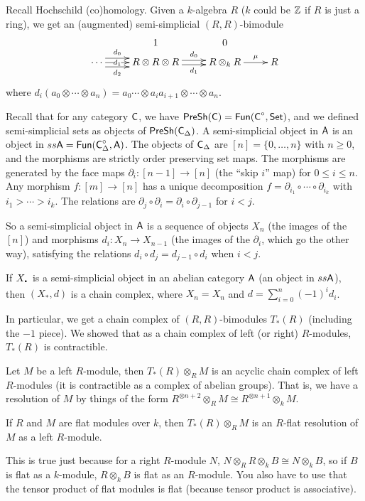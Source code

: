
Recall Hochschild (co)homology. Given a $k$-algebra $R$ ($k$ could be $\mathbb{Z}$ if $R$ is just a ring), we get an (augmented) semi-simplicial $(R,R)$-bimodule
\[\xymatrix@R-1.5pc{
  & 1 & 0\\
 \cdots \ar[r]|-{d_1}\ar@<1ex>[r]^-{d_0}\ar@<-1ex>[r]_-{d_2} & R\otimes R\otimes R\ar@<.5ex>[r]^-{d_0}\ar@<-.5ex>[r]_-{d_1} & R\otimes_k R\ar[r]^-\mu & R
}\]
where $d_i(a_0\otimes \cdots \otimes a_n)= a_0\cdots \otimes a_ia_{i+1}\otimes \cdots \otimes a_n$.

Recall that for any category $\text{\sf C}$, we have $\operatorname{\sf PreSh}(\text{\sf C})=\text{\sf Fun}(\text{\sf C}^\circ,\operatorname{\sf Set})$, and we defined semi-simplicial sets as objects of $\operatorname{\sf PreSh}(\text{\sf C}_\Delta)$. A semi-simplicial object in $\text{\sf A}$ is an object in $ss\text{\sf A}=\text{\sf Fun}(\text{\sf C}_\Delta^\circ, \text{\sf A})$. The objects of $\text{\sf C}_\Delta$ are $[n]=\{0,\dots, n\}$ with $n\ge 0$, and the morphisms are strictly order preserving set maps. The morphisms are generated by the face maps $\partial_i\colon [n-1]\to [n]$ (the ``skip $i$'' map) for $0\le i\le n$. Any morphism $f\colon [m]\to [n]$ has a unique decomposition $f=\partial_{i_1}\circ\cdots\circ \partial_{i_k}$ with $i_1>\cdots >i_k$. The relations are $\partial_j\circ \partial_i=\partial_i\circ\partial_{j-1}$ for $i<j$.

So a semi-simplicial object in $\text{\sf A}$ is a sequence of objects $X_n$ (the images of the $[n]$) and morphisms $d_i\colon X_n\to X_{n-1}$ (the images of the $\partial_i$, which go the other way), satisfying the relations $d_i\circ d_j=d_{j-1}\circ d_i$ when $i<j$.

\begin{lemma}
 If $X_\udot$ is a semi-simplicial object in an abelian category $\text{\sf A}$ (an object in $ss\text{\sf A}$), then $(X_*,d)$ is a chain complex, where $X_n=X_n$ and $d=\sum_{i=0}^n (-1)^i d_i$.
\end{lemma}
 In particular, we get a chain complex of $(R,R)$-bimodules $T_*(R)$ (including the $-1$ piece). We showed that as a chain complex of left (or right) $R$-modules, $T_*(R)$ is contractible.

Let $M$ be a left $R$-module, then $T_*(R)\otimes_R M$ is an acyclic chain complex of left $R$-modules (it is contractible as a complex of abelian groups). That is, we have a resolution of $M$ by things of the form $R^{\otimes n+2}\otimes_R M\cong R^{\otimes n+1}\otimes_k M$.
\begin{lemma}
 If $R$ and $M$ are flat modules over $k$, then $T_*(R)\otimes_R M$ is an $R$-flat resolution of $M$ as a left $R$-module.
\end{lemma}
This is true just because for a right $R$-module $N$, $N\otimes_R R\otimes_k B\cong N\otimes_k B$, so if $B$ is flat as a $k$-module, $R\otimes_k B$ is flat as an $R$-module. You also have to use that the tensor product of flat modules is flat (because tensor product is associative).

